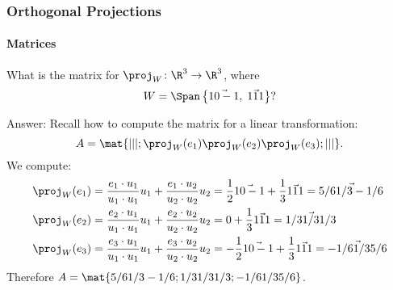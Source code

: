 
\begin{frame}
\frametitle{Orthogonal Projections}
\framesubtitle{Matrices}

\displayskips{2pt}
What is the matrix for $\proj_W\colon\R^3\to\R^3$, where 
\[ W = \Span\left\{ \vec{1 0 -1},\;\vec{1 1 1} \right\}? \]

\footnotesize
\begin{webonly}%
\alert{Answer:}
Recall how to compute the matrix for a linear transformation:
\[ A = \mat{| | |; \proj_W(e_1) \proj_W(e_2) \proj_W(e_3); | | |}. \]
We compute:
\[\begin{split}
  \proj_W(e_1) &= \frac{e_1\cdot u_1}{u_1\cdot u_1}u_1 +
  \frac{e_1\cdot u_2}{u_2\cdot u_2}u_2
  = \frac 12\vec{1 0 -1} + \frac 13\vec{1 1 1}
  = \vec{5/6 1/3 -1/6} \\
  \proj_W(e_2) &= \frac{e_2\cdot u_1}{u_1\cdot u_1}u_1 +
  \frac{e_2\cdot u_2}{u_2\cdot u_2}u_2
  = 0 + \frac 13\vec{1 1 1}
  = \vec{1/3 1/3 1/3} \\
  \proj_W(e_3) &= \frac{e_3\cdot u_1}{u_1\cdot u_1}u_1 +
  \frac{e_3\cdot u_2}{u_2\cdot u_2}u_2
  = -\frac 12\vec{1 0 -1} + \frac 13\vec{1 1 1}
  = \vec{-1/6 1/3 5/6}
\end{split}\]
Therefore $A = \mat{5/6 1/3 -1/6; 1/3 1/3 1/3; -1/6 1/3 5/6}$.
  
\end{webonly}

\end{frame}



